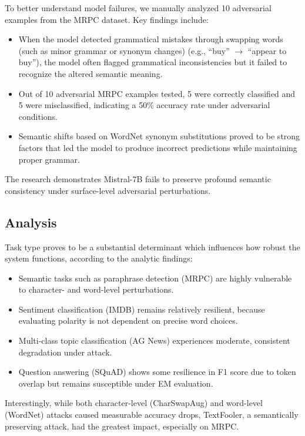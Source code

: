 \documentclass[conference]{IEEEtran}
\begin{document}
To better understand model failures, we manually analyzed 10 adversarial examples from the MRPC dataset.  
Key findings include:
\begin{itemize}
    \item When the model detected grammatical mistakes through swapping words (such as minor grammar or synonym changes) (e.g., ``buy'' $\rightarrow$ ``appear to buy''), the model often flagged grammatical inconsistencies but it failed to recognize the altered semantic meaning.
    \item Out of 10 adversarial MRPC examples tested, 5 were correctly classified and 5 were misclassified, indicating a 50\% accuracy rate under adversarial conditions.
    \item Semantic shifts based on WordNet synonym substitutions proved to be strong factors that led the model to produce incorrect predictions while maintaining proper grammar.
\end{itemize}


The research demonstrates Mistral-7B fails to preserve profound semantic consistency under surface-level adversarial perturbations.

\subsection{Analysis}

Task type proves to be a substantial determinant which influences how robust the system functions, according to the analytic findings:
\begin{itemize}
    \item Semantic tasks such as paraphrase detection (MRPC) are highly vulnerable to character- and word-level perturbations.
    \item Sentiment classification (IMDB) remains relatively resilient, because evaluating polarity is not dependent on precise word choices.
    \item Multi-class topic classification (AG News) experiences moderate, consistent degradation under attack.
    \item Question answering (SQuAD) shows some resilience in F1 score due to token overlap but remains susceptible under EM evaluation.
\end{itemize}

Interestingly, while both character-level (CharSwapAug) and word-level (WordNet) attacks caused measurable accuracy drops, TextFooler, a semantically preserving attack, had the greatest impact, especially on MRPC.
\end{document}
